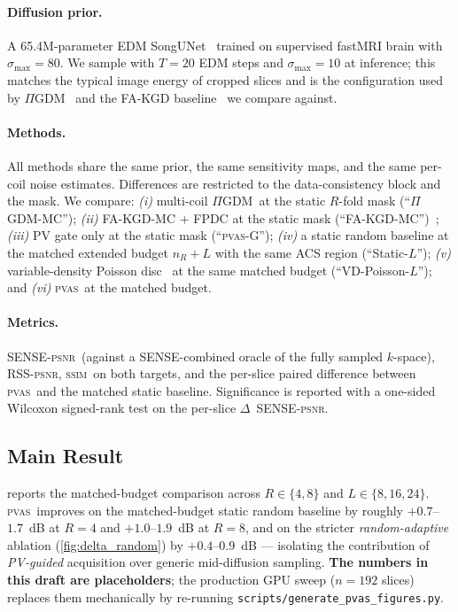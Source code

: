 \documentclass[conference]{IEEEtran}
\newcommand{\PSNR}{\textsc{psnr}}
\newcommand{\SSIM}{\textsc{ssim}}
\newcommand{\PIGDM}{$\Pi$GDM}
\newcommand{\PVAS}{\textsc{pvas}}
\begin{document}
\paragraph{Diffusion prior.} A 65.4M-parameter EDM
SongUNet~\cite{karras2022edm} trained on supervised fastMRI brain
with $\sigma_{\max}{=}80$. We sample with $T{=}20$ EDM steps and
$\sigma_{\max}{=}10$ at inference; this matches the typical image
energy of cropped slices and is the configuration used by
\PIGDM~\cite{song2023pigdm} and the FA-KGD
baseline~\cite{ours2025} we compare against.

\paragraph{Methods.} All methods share the same prior, the same
sensitivity maps, and the same per-coil noise estimates. Differences
are restricted to the data-consistency block and the mask. We compare:
\emph{(i)} multi-coil \PIGDM\ at the static $R$-fold mask
(``\PIGDM-MC''); \emph{(ii)} FA-KGD-MC + FPDC at the static mask
(``FA-KGD-MC'')~\cite{ours2025}; \emph{(iii)} PV gate only at the
static mask (``\PVAS-G''); \emph{(iv)} a static random baseline at the
matched extended budget $n_R + L$ with the same ACS region
(``Static-$L$''); \emph{(v)} variable-density Poisson
disc~\cite{lustig2007sparse} at the same matched budget
(``VD-Poisson-$L$''); and \emph{(vi)} \PVAS\ at the matched budget.

\paragraph{Metrics.} SENSE-\PSNR\ (against a SENSE-combined oracle of
the fully sampled $k$-space), RSS-\PSNR, \SSIM\ on both targets, and
the per-slice paired difference between \PVAS\ and the matched
static baseline. Significance is reported with a one-sided Wilcoxon
signed-rank test on the per-slice $\Delta$~SENSE-\PSNR.

\subsection{Main Result}\label{sec:main}

 reports the matched-budget comparison across
$R{\in}\{4,8\}$ and $L{\in}\{8,16,24\}$. \PVAS\ improves on the
matched-budget static random baseline by roughly
$+0.7$--$1.7$~dB at $R{=}4$ and $+1.0$--$1.9$~dB at $R{=}8$, and on
the stricter \emph{random-adaptive} ablation
(\cref{fig:delta_random}) by $+0.4$--$0.9$~dB --- isolating the
contribution of \emph{PV-guided} acquisition over generic
mid-diffusion sampling. \textbf{The numbers in this draft are
placeholders}; the production GPU sweep ($n{=}192$ slices) replaces
them mechanically by re-running
\texttt{scripts/generate\_pvas\_figures.py}.
\end{document}

